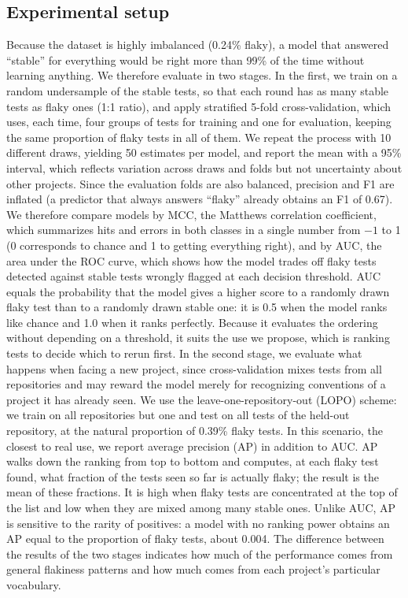 \subsection{Experimental setup}
Because the dataset is highly imbalanced (0.24\% flaky), a model that answered ``stable'' for everything would be right more than 99\% of the time without learning anything. We therefore evaluate in two stages. In the first, we train on a random undersample of the stable tests, so that each round has as many stable tests as flaky ones (1:1 ratio), and apply stratified 5-fold cross-validation, which uses, each time, four groups of tests for training and one for evaluation, keeping the same proportion of flaky tests in all of them. We repeat the process with 10 different draws, yielding 50 estimates per model, and report the mean with a 95\% interval, which reflects variation across draws and folds but not uncertainty about other projects. Since the evaluation folds are also balanced, precision and F1 are inflated (a predictor that always answers ``flaky'' already obtains an F1 of 0.67). We therefore compare models by MCC, the Matthews correlation coefficient, which summarizes hits and errors in both classes in a single number from $-1$ to 1 (0 corresponds to chance and 1 to getting everything right), and by AUC, the area under the ROC curve, which shows how the model trades off flaky tests detected against stable tests wrongly flagged at each decision threshold. AUC equals the probability that the model gives a higher score to a randomly drawn flaky test than to a randomly drawn stable one: it is 0.5 when the model ranks like chance and 1.0 when it ranks perfectly. Because it evaluates the ordering without depending on a threshold, it suits the use we propose, which is ranking tests to decide which to rerun first.
In the second stage, we evaluate what happens when facing a new project, since cross-validation mixes tests from all repositories and may reward the model merely for recognizing conventions of a project it has already seen. We use the leave-one-repository-out (LOPO) scheme: we train on all repositories but one and test on all tests of the held-out repository, at the natural proportion of 0.39\% flaky tests. In this scenario, the closest to real use, we report average precision (AP) in addition to AUC. AP walks down the ranking from top to bottom and computes, at each flaky test found, what fraction of the tests seen so far is actually flaky; the result is the mean of these fractions. It is high when flaky tests are concentrated at the top of the list and low when they are mixed among many stable ones. Unlike AUC, AP is sensitive to the rarity of positives: a model with no ranking power obtains an AP equal to the proportion of flaky tests, about 0.004. The difference between the results of the two stages indicates how much of the performance comes from general flakiness patterns and how much comes from each project's particular vocabulary.
